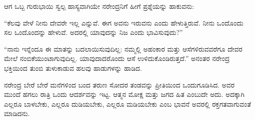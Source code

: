 ಆಗ ಒಬ್ಬ ಗುರುಭಾಯಿ ಸ್ವಲ್ಪ ಹಾಸ್ಯವಾಗಿಯೇ ನರೇಂದ್ರನಿಗೆ ಹೀಗೆ ಪ್ರಶ್ನೆಯನ್ನು ಹಾಕುವನು:

“ಕೆಲವು ವೇಳೆ ನೀನು ದೇವರೇ ಇಲ್ಲ ಎನ್ನುವೆ. ಈಗ ಅವನು ಇರುವನು ಎಂದು ಹೇಳುತ್ತಿರುವೆ. ನೀನು ಒಂದೊಂದು ಸಲ ಒಂದೊಂದನ್ನು ಹೇಳುವೆ. ಅದರಲ್ಲಿ ಯಾವುದನ್ನು ನಿಜ ಎಂದು ಭಾವಿಸುವುದು?”

“ನಾನು ಇನ್ನೆಂದೂ ಈ ಮಾತನ್ನು ಬದಲಾಯಿಸುವುದಿಲ್ಲ: ನಮ್ಮಲ್ಲಿ ಅಹಂಕಾರ ಮತ್ತು ಆಸೆಗಳಿರುವವರೆಗೂ ದೇವರ ಮೇಲೆ ನಂಬಿಕೆಯುಂಟಾಗುವುದಿಲ್ಲ. ಯಾವುದಾದರೊಂದು ಆಸೆ ಉಳಿದುಕೊಂಡಿರುತ್ತದೆ.” ಅನಂತರ ನರೇಂದ್ರ ಭಕ್ತಿಯಿಂದ ತುಂಬಿ ತುಳುಕಾಡುವ ಹಲವು ಹಾಡುಗಳನ್ನು ಹಾಡಿದ.

ನರೇಂದ್ರ ಬೇರೆ ಬೇರೆ ಮನೆಗಳಿಂದ ಬಂದ ತರುಣ ಸೋದರ ತಂಡವನ್ನು ಪ್ರೀತಿಯಿಂದ ಒಂದುಗೂಡಿಸಿದ. ಅವರ ಮುಂದೆ ಹಗಲು ರಾತ್ರಿ ಒಂದು ಆದರ್ಶವನ್ನು ಇಟ್ಟ. ಆತ್ಮನ ಮೋಕ್ಷ ಮತ್ತು ಜಗದ ಹಿತ ಎಂಬುದೇ ಅದು. ಅದಕ್ಕಾಗಿ ಎಲ್ಲರೂ ಬಾಳಬೇಕು, ಎಲ್ಲರೂ ದುಡಿಯಬೇಕು, ಎಲ್ಲರೂ ಮಡಿಯಬೇಕು ಎಂಬ ಭಾವನೆ ಅವರಲ್ಲಿ ರಕ್ತಗತವಾಗುವಂತೆ ಮಾಡಿದನು.

